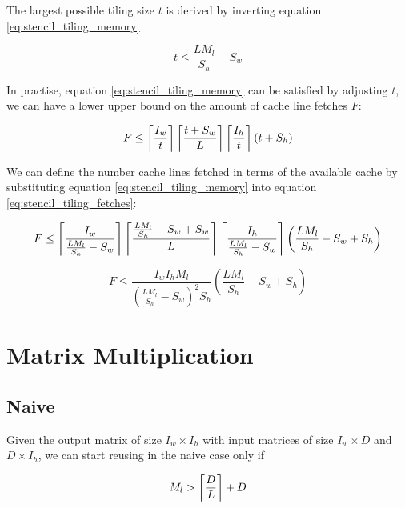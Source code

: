 The largest possible tiling size $t$ is derived by inverting equation \ref{eq:stencil_tiling_memory}

\begin{equation}
    t \leq \frac{L M_l}{S_h} - S_w
\end{equation}

In practise, equation \ref{eq:stencil_tiling_memory} can be satisfied by adjusting $t$, we can have a lower upper bound on the amount of cache line fetches $F$:

\begin{equation}
    F \leq \left\lceil \frac{I_w}{t} \right\rceil \left\lceil \frac{t + S_w}{L} \right\rceil \left\lceil \frac{I_h}{t} \right\rceil (t + S_h)
    \label{eq:stencil_tiling_fetches}
\end{equation}

We can define the number cache lines fetched in terms of the available cache by substituting equation \ref{eq:stencil_tiling_memory} into equation \ref{eq:stencil_tiling_fetches}:

\begin{equation}
    F \leq \left\lceil \frac{I_w}{\frac{L M_l}{S_h} - S_w} \right\rceil \left\lceil \frac{\frac{L M_l}{S_h} - S_w + S_w}{L} \right\rceil \left\lceil \frac{I_h}{\frac{L M_l}{S_h} - S_w} \right\rceil \left(\frac{L M_l}{S_h} - S_w + S_h\right)
\end{equation}

\begin{equation}
    F \leq \frac{I_w I_h M_l}{(\frac{L M_l}{S_h} - S_w)^2 S_h} (\frac{L M_l}{S_h} - S_w + S_h)
\end{equation}



\section{Matrix Multiplication}

\subsection{Naive}

Given the output matrix of size $I_w \times I_h$ with input matrices of size $I_w \times D$ and $D \times I_h$, we can start reusing in the naive case only if

\begin{equation}
    \label{eq:mm_naive_minimum_cache}
    M_l > \left\lceil \frac{D}{L} \right\rceil + D
\end{equation}

